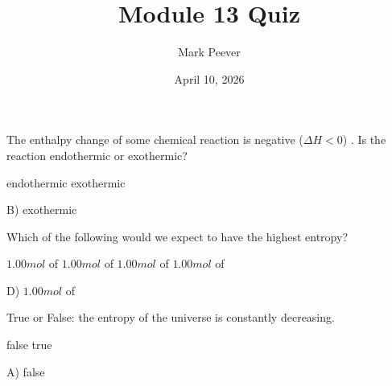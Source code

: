 \documentclass[11pt,addpoints]{exam}   	%
\title{Module 13 Quiz}
\author{Mark Peever}
\date{April 10, 2026}							%
\begin{document}
\maketitle
\pointsinrightmargin

\begin{center}
\end{center}
\vspace{0.1in}
\vspace{0.2in}

\begin{questions}

\question[5] The enthalpy change of some chemical reaction is negative  ($\Delta H < 0$) . 
Is the reaction endothermic or exothermic?

\begin{choices}
\choice endothermic
\choice exothermic
\end{choices}

\begin{solution}
B) exothermic
\end{solution}

\vspace{0.2in}

\question[5] Which of the following would we expect to have the highest entropy?

\begin{choices}
\choice $1.00 mol$ of 
\choice $1.00 mol$ of 
\choice $1.00 mol$ of 
\choice $1.00 mol$ of 
\end{choices}

\begin{solution}
D) $1.00 mol$ of 
\end{solution}

\vspace{0.2in}

\question[5] True or False: the entropy of the universe is constantly decreasing.

\begin{choices}
\choice false
\choice true
\end{choices}

\begin{solution}
A) false
\end{solution}


\end{questions}
\end{document}
